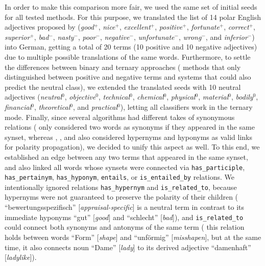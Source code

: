 In order to make this comparison more fair, we used the same set of
initial seeds for all tested methods.  For this purpose, we translated
the list of 14 polar English adjectives proposed by \citet{Turney:03}
(\emph{good}$^+$, \emph{nice}$^+$, \emph{excellent}$^+$,
\emph{positive}$^+$, \emph{fortunate}$^+$, \emph{correct}$^+$,
\emph{superior}$^+$, \emph{bad}$^-$, \emph{nasty}$^-$,
\emph{poor}$^-$, \emph{negative}$^-$, \emph{unfortunate}$^-$,
\emph{wrong}$^-$, and \emph{inferior}$^-$) into German, getting a
total of 20 terms (10 positive and 10 negative adjectives) due to
multiple possible translations of the same words.  Furthermore, to
settle the differences between binary and ternary approaches (\ie{}
methods that only distinguished between positive and negative terms
and systems that could also predict the neutral class), we extended
the translated seeds with 10 neutral adjectives (\emph{neutral}$^0$,
\emph{objective}$^0$, \emph{technical}$^0$, \emph{chemical}$^0$,
\emph{physical}$^0$, \emph{material}$^0$, \emph{bodily}$^0$,
\emph{financial}$^0$, \emph{theoretical}$^0$, and
\emph{practical}$^0$), letting all classifiers work in the ternary
mode.  Finally, since several algorithms had different takes of
synonymous relations (\eg{} \citeauthor{Hu:04} only considered two
words as synonyms if they appeared in the same synset, whereas
\citeauthor{Esuli:06c}, \citeauthor{Rao:09}, and
\citeauthor{Awadallah:10} also considered hypernyms and hyponyms as
valid links for polarity propagation), we decided to unify this aspect
as well.  To this end, we established an edge between any two terms
that appeared in the same synset, and also linked all words whose
synsets were connected via \texttt{has\_participle},
\texttt{has\_pertainym}, \texttt{has\_hyponym}, \texttt{entails}, or
\texttt{is\_entailed\_by} relations. We intentionally ignored
relations \texttt{has\_hypernym} and \texttt{is\_related\_to}, because
hypernyms were not guaranteed to preserve the polarity of their
children (\eg{} ``bewertungsspezifisch'' [\emph{appraisal-specific}]
is a neutral term in contrast to its immediate hyponyms ``gut''
[\emph{good}] and ``schlecht'' [\emph{bad}]), and
\texttt{is\_related\_to} could connect both synonyms and antonyms of
the same term (\eg{} this relation holds between words ``Form''
[\emph{shape}] and ``unf\"ormig'' [\emph{misshapen}], but at the same
time, it also connects noun ``Dame'' [\emph{lady}] to its derived
adjective ``damenhaft'' [\emph{ladylike}]).

